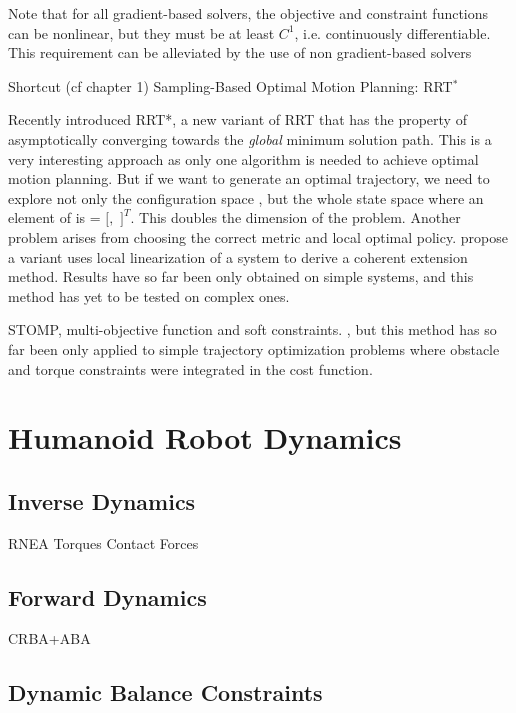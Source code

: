 Note that for all gradient-based solvers, the objective and constraint
functions can be nonlinear, but they must be at least $C^1$,
i.e. continuously differentiable. This requirement can be alleviated
by the use of non gradient-based solvers

Shortcut (cf chapter 1)
Sampling-Based Optimal Motion Planning: RRT$^*$

Recently \cite{Karaman2011} introduced RRT*, a new variant of RRT that
has the property of asymptotically converging towards the \emph{global}
minimum solution path. This is a very interesting approach as only one
algorithm is needed to achieve optimal motion planning. But if we want
to generate an optimal trajectory, we need to explore not only the
configuration space \cspace, but the whole state space
\sspace\thinspace where an element of \sspace\enspace is \state{} =
$[$\config{}$,$ \dotconfig{}$]^T$. This doubles the dimension of the
problem. Another problem arises from choosing the correct metric and
local optimal policy. \cite{Perez2012} propose a variant uses local
linearization of a system to derive a coherent extension
method. Results have so far been only obtained on simple systems, and
this method has yet to be tested on complex ones.

STOMP, multi-objective function and soft constraints.
\cite{Kalakrishnan2011}, but this method has so far been only applied
to simple trajectory optimization problems where obstacle and torque
constraints were integrated in the cost function. 

\section{Humanoid Robot Dynamics}

\subsection{Inverse Dynamics}

RNEA
Torques
Contact Forces

\subsection{Forward Dynamics}

CRBA+ABA

\subsection{Dynamic Balance Constraints}

